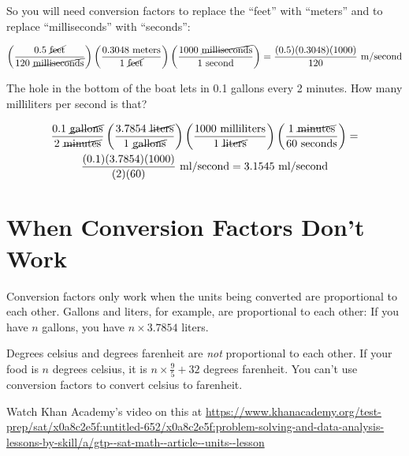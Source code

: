 So you will need conversion factors to replace the ``feet'' with ``meters'' and to replace ``milliseconds'' with ``seconds'':

\begin{multline*}
\left(\frac{0.5 \text{ \cancel{feet}}}{120 \text{ \cancel{milliseconds}}}\right) \left( \frac{0.3048 \text{ meters}}{1 \text{ \cancel{feet}}} \right) \left( \frac{ 1000 \text{ \cancel{milliseconds}}} {1 \text{ second}}\right) = \frac{(0.5)(0.3048)(1000)}{120}\text{ m/second}
\end{multline*}

\begin{Exercise}[title={Conversion Factors}, label=conversion_factors]

The hole in the bottom of the boat lets in 0.1 gallons every 2 minutes.  How many milliliters per second is that?
  
\end{Exercise}
\begin{Answer}[ref=conversion_factors]

  \begin{multline*}
    \frac{0.1 \text{ \cancel{gallons}}}{2 \text{ \cancel{minutes}}}
  \left( \frac{3.7854 \text{ \cancel{liters}}}{1 \text{ \cancel{gallons}}} \right)
  \left( \frac{1000 \text{ milliliters}}{1\text{ \cancel{liters}}}\right)
  \left( \frac{1 \text{ \cancel{minutes}}}{60 \text{ seconds}} \right) = \\
  \frac{(0.1)(3.7854)(1000)}{(2)(60)} \text{ ml/second} = 3.1545 \text{ ml/second}
  \end{multline*}
  
\end{Answer}

\section{When Conversion Factors Don't Work}

Conversion factors only work when the units being converted are
proportional to each other. Gallons and liters, for example, are
proportional to each other: If you have $n$ gallons, you have $n
\times 3.7854$ liters.

Degrees celsius and degrees farenheit are \textit{not} proportional to
each other.  If your food is $n$ degrees celsius, it is $n \times
\frac{9}{5} + 32$ degrees farenheit.  You can't use conversion factors
to convert celsius to farenheit.

Watch Khan Academy's video on this at \url{https://www.khanacademy.org/test-prep/sat/x0a8c2e5f:untitled-652/x0a8c2e5f:problem-solving-and-data-analysis-lessons-by-skill/a/gtp--sat-math--article--units--lesson}


